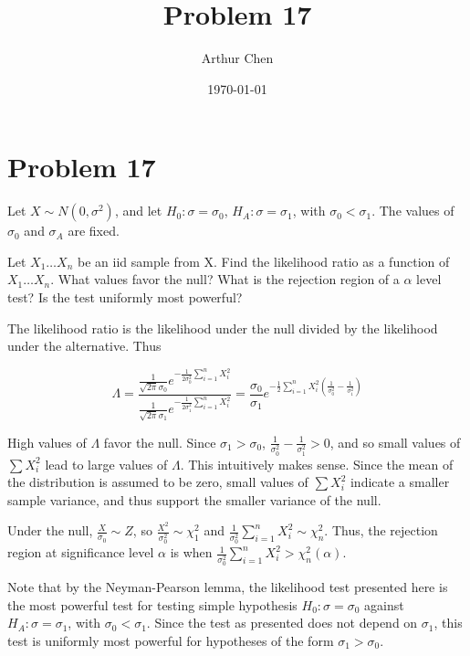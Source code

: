 \documentclass{article}
\author{Arthur Chen}
\title{Problem 17}
\date{\today}
\begin{document}
\section*{Problem 17}

Let $X \sim N(0, \sigma^2)$, and let $H_0: \sigma = \sigma_0$, $H_A: \sigma = \sigma_1$, with $\sigma_0 < \sigma_1$. The values of $\sigma_0$ and $\sigma_A$ are fixed.

Let $X_1 \dots X_n$ be an iid sample from X. Find the likelihood ratio as a function of $X_1 \dots X_n$. What values favor the null? What is the rejection region of a $\alpha$ level test? Is the test uniformly most powerful?

The likelihood ratio is the likelihood under the null divided by the likelihood under the alternative. Thus

\[
\Lambda = \frac{
\frac{1}{\sqrt{2\pi}\sigma_0}
e^{-\frac{1}{2\sigma_0^2} \sum_{i=1}^n X_i^2}
}
{
\frac{1}{\sqrt{2\pi}\sigma_1}
e^{-\frac{1}{2\sigma_1^2} \sum_{i=1}^n X_i^2}
}
= \frac{\sigma_0}{\sigma_1} e^{-\frac{1}{2} \sum_{i=1}^n X_i^2 (\frac{1}{\sigma_0^2} - \frac{1}{\sigma_1^2})}
\]

High values of $\Lambda$ favor the null. Since $\sigma_1 > \sigma_0$, $\frac{1}{\sigma_0^2} - \frac{1}{\sigma_1^2} > 0$, and so small values of $\sum X_i^2$ lead to large values of $\Lambda$. This intuitively makes sense. Since the mean of the distribution is assumed to be zero, small values of $\sum X_i^2$ indicate a smaller sample variance, and thus support the smaller variance of the null.

Under the null, $\frac{X}{\sigma_0} \sim Z$, so $\frac{X^2}{\sigma_0^2} \sim \chi_1^2$ and $\frac{1}{\sigma_0^2} \sum_{i=1}^n X_i^2 \sim \chi_n^2$. Thus, the rejection region at significance level $\alpha$ is when $\frac{1}{\sigma_0^2} \sum_{i=1}^n X_i^2 > \chi_n^2(\alpha)$.

Note that by the Neyman-Pearson lemma, the likelihood test presented here is the most powerful test for testing simple hypothesis $H_0: \sigma = \sigma_0$ against $H_A: \sigma = \sigma_1$, with $\sigma_0 < \sigma_1$. Since the test as presented does not depend on $\sigma_1$, this test is uniformly most powerful for hypotheses of the form $\sigma_1 > \sigma_0$.
\end{document}
